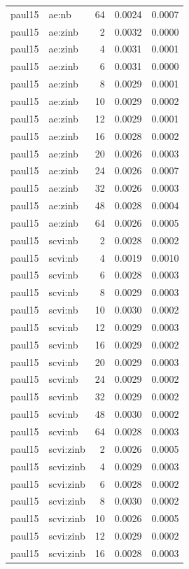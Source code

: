 \begin{tabular}{llrrr}
paul15 & ae:nb & 64 & 0.0024 & 0.0007 \\
paul15 & ae:zinb & 2 & 0.0032 & 0.0000 \\
paul15 & ae:zinb & 4 & 0.0031 & 0.0001 \\
paul15 & ae:zinb & 6 & 0.0031 & 0.0000 \\
paul15 & ae:zinb & 8 & 0.0029 & 0.0001 \\
paul15 & ae:zinb & 10 & 0.0029 & 0.0002 \\
paul15 & ae:zinb & 12 & 0.0029 & 0.0001 \\
paul15 & ae:zinb & 16 & 0.0028 & 0.0002 \\
paul15 & ae:zinb & 20 & 0.0026 & 0.0003 \\
paul15 & ae:zinb & 24 & 0.0026 & 0.0007 \\
paul15 & ae:zinb & 32 & 0.0026 & 0.0003 \\
paul15 & ae:zinb & 48 & 0.0028 & 0.0004 \\
paul15 & ae:zinb & 64 & 0.0026 & 0.0005 \\
paul15 & scvi:nb & 2 & 0.0028 & 0.0002 \\
paul15 & scvi:nb & 4 & 0.0019 & 0.0010 \\
paul15 & scvi:nb & 6 & 0.0028 & 0.0003 \\
paul15 & scvi:nb & 8 & 0.0029 & 0.0003 \\
paul15 & scvi:nb & 10 & 0.0030 & 0.0002 \\
paul15 & scvi:nb & 12 & 0.0029 & 0.0003 \\
paul15 & scvi:nb & 16 & 0.0029 & 0.0002 \\
paul15 & scvi:nb & 20 & 0.0029 & 0.0003 \\
paul15 & scvi:nb & 24 & 0.0029 & 0.0002 \\
paul15 & scvi:nb & 32 & 0.0029 & 0.0002 \\
paul15 & scvi:nb & 48 & 0.0030 & 0.0002 \\
paul15 & scvi:nb & 64 & 0.0028 & 0.0003 \\
paul15 & scvi:zinb & 2 & 0.0026 & 0.0005 \\
paul15 & scvi:zinb & 4 & 0.0029 & 0.0003 \\
paul15 & scvi:zinb & 6 & 0.0028 & 0.0002 \\
paul15 & scvi:zinb & 8 & 0.0030 & 0.0002 \\
paul15 & scvi:zinb & 10 & 0.0026 & 0.0005 \\
paul15 & scvi:zinb & 12 & 0.0029 & 0.0002 \\
paul15 & scvi:zinb & 16 & 0.0028 & 0.0003 \\

\end{tabular}
